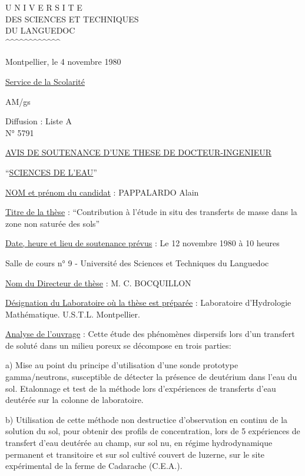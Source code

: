 U N I V E R S I T E\\
DES SCIENCES ET TECHNIQUES\\
DU LANGUEDOC\\
\textasciicircum{}\textasciicircum{}\textasciicircum{}\textasciicircum{}\textasciicircum{}\textasciicircum{}\textasciicircum{}\textasciicircum{}\textasciicircum{}\textasciicircum{}\textasciicircum{}\textasciicircum{}

Montpellier, le 4 novembre 1980

\uline{Service de la Scolarité}

AM/gs

Diffusion : Liste A\\
N° 5791

\uline{AVIS DE SOUTENANCE D'UNE THESE DE DOCTEUR-INGENIEUR}

``\uline{SCIENCES DE L'EAU}''

\uline{NOM et prénom du candidat} : PAPPALARDO Alain

\uline{Titre de la thèse} : ``Contribution à l'étude in situ des transferts de masse dans la zone non saturée des sols''

\uline{Date, heure et lieu de soutenance prévus} : Le 12 novembre 1980 à 10 heures

Salle de cours n° 9 - Université des Sciences et Techniques du Languedoc

\uline{Nom du Directeur de thèse} : M. C. BOCQUILLON

\uline{Désignation du Laboratoire où la thèse est préparée} : Laboratoire d'Hydrologie Mathématique. U.S.T.L. Montpellier.

\uline{Analyse de l'ouvrage} : Cette étude des phénomènes dispersifs lors d'un transfert de soluté dans un milieu poreux se décompose en trois parties:

a) Mise au point du principe d'utilisation d'une sonde prototype gamma/neutrons, susceptible de détecter la présence de deutérium dans l'eau du sol. Etalonnage et test de la méthode lors d'expériences de transferts d'eau deutérée sur la colonne de laboratoire.

b) Utilisation de cette méthode non destructice d'observation en continu de la solution du sol, pour obtenir des profils de concentration, lors de 5 expériences de transfert d'eau deutérée au champ, sur sol nu, en régime hydrodynamique permanent et transitoire et sur sol cultivé couvert de luzerne, sur le site expérimental de la ferme de Cadarache (C.E.A.).


